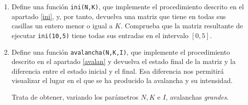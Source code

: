 \begin{ejer}
\begin{enumerate}
  \item  {\sc Define} una funci\'on {\tt ini(N,K)}, que implemente el
procedimiento descrito en el apartado {\ref{ini}}, y, por tanto, devuelva una
matriz que tiene en todas sus casillas un entero menor o igual a $K$. {\sc
Comprueba} que la matriz resultante de ejecutar {\tt ini(10,5)} tiene todas sus
entradas en el intervalo $[0,5].$

\item  {\sc Define} una funci\'on {\tt avalancha(N,K,I)}, que
implemente el procedimiento descrito en el apartado {\ref{avalan}} y devuelva el
estado final de la matriz y la diferencia entre el estado inicial y el final.
Esa diferencia nos permitir\'a visualizar el lugar en el que se ha producido la
avalancha y su intensidad. 

{\sc Trata} de obtener, variando los par\'ametros $N,K$ e $I$, avalanchas
{\itshape grandes}.
\end{enumerate}
\end{ejer}
